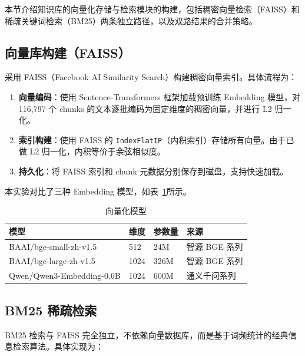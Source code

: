 \documentclass[12pt, a4paper]{article}
\begin{document}
本节介绍知识库的向量化存储与检索模块的构建，包括稠密向量检索（FAISS）和稀疏关键词检索（BM25）两条独立路径，以及双路结果的合并策略。

\subsection{向量库构建（FAISS）}

采用 FAISS（Facebook AI Similarity Search）构建稠密向量索引。具体流程为：

\begin{enumerate}[leftmargin=2em]
    \item \textbf{向量编码}：使用 Sentence-Transformers 框架加载预训练 Embedding 模型，对 116,797 个 chunks 的文本逐批编码为固定维度的稠密向量，并进行 L2 归一化。
    \item \textbf{索引构建}：使用 FAISS 的 \texttt{IndexFlatIP}（内积索引）存储所有向量。由于已做 L2 归一化，内积等价于余弦相似度。
    \item \textbf{持久化}：将 FAISS 索引和 chunk 元数据分别保存到磁盘，支持快速加载。
\end{enumerate}

本实验对比了三种 Embedding 模型，如表~\ref{tab:embed_models}所示。

\begin{table}[H]
\centering
\caption{向量化模型}
\label{tab:embed_models}
\begin{tabular}{llll}
\toprule
\textbf{模型} & \textbf{维度} & \textbf{参数量} & \textbf{来源} \\
\midrule
BAAI/bge-small-zh-v1.5  & 512  & 24M  & 智源 BGE 系列 \\
BAAI/bge-large-zh-v1.5  & 1024 & 326M & 智源 BGE 系列 \\
Qwen/Qwen3-Embedding-0.6B & 1024 & 600M & 通义千问系列 \\
\bottomrule
\end{tabular}
\end{table}

\subsection{BM25 稀疏检索}

BM25 检索与 FAISS 完全独立，不依赖向量数据库，而是基于词频统计的经典信息检索算法。具体实现为：
\end{document}
